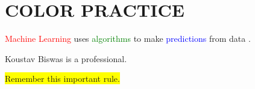 \documentclass{article}
\begin{document}
	
	\section{COLOR PRACTICE}
	
	\textcolor{red}{Machine Learning} uses
	\textcolor{green}{algorithms} to make
	\textcolor{blue}{predictions} from data \newline.
	
	\textcolor{myblue}{Koustav Biswas is a professional.}
	
	\colorbox{yellow}{Remember this important rule.}
	
	
\end{document}
